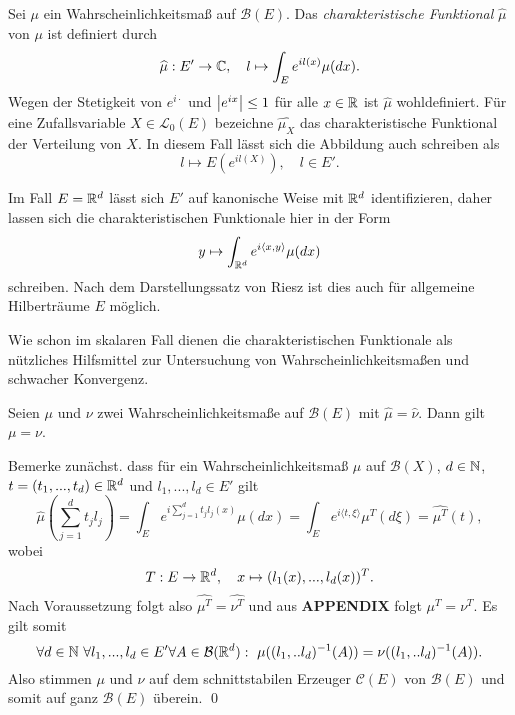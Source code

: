 \begin{mydef}
    Sei $\mu$ ein Wahrscheinlichkeitsmaß auf $\mathcal{B}(E)$. 
    Das \textit{charakteristische Funktional} $\widehat{\mu}$ von $\mu$ ist definiert durch
    $$
        \widehat{\mu} : E' \to \mathbb{C}, \quad l \mapsto \int_{E}e^{il(x)}\mu(dx).
    $$
    Wegen der Stetigkeit von $e^{i\cdot}$ und $\left| e^{ix} \right|\leq 1$ für alle $x \in \mathbb{R}$ ist $\widehat{\mu}$ wohldefiniert. 
    Für eine Zufallsvariable $X \in \mathcal{L}_0(E)$ bezeichne $\widehat{\mu_X}$ das charakteristische Funktional der Verteilung von $X$. In diesem Fall lässt sich die Abbildung auch schreiben als
    $$
        l \mapsto E(e^{il(X)}), \quad l \in E'. 
    $$
\end{mydef}



\begin{remark}
    Im Fall $E = \mathbb{R}^d$ lässt sich $E'$ auf kanonische Weise mit $\mathbb{R}^d$ identifizieren, daher lassen sich die charakteristischen Funktionale hier in der Form 
    $$
        y \mapsto \int_{\mathbb{R}^d}e^{i\langle x, y\rangle}\mu(dx)
    $$
    schreiben. Nach dem Darstellungssatz von Riesz ist dies auch für allgemeine Hilberträume $E$ möglich. 
\end{remark}

Wie schon im skalaren Fall dienen die charakteristischen Funktionale als nützliches Hilfsmittel zur Untersuchung von Wahrscheinlichkeitsmaßen und schwacher Konvergenz.

\begin{theorem}[Eindeutigkeitssatz]
    Seien $\mu$ und $\nu$ zwei Wahrscheinlichkeitsmaße auf $\mathcal{B}(E)$ mit $\widehat{\mu} = \widehat{\nu}$. Dann gilt $\mu = \nu$.
\end{theorem}

\begin{proof*}
    Bemerke zunächst. dass für ein Wahrscheinlichkeitsmaß $\mu$ auf $\mathcal{B}(X)$, $d \in  \mathbb{N}$, $t=(t_1,...,t_d) \in \mathbb{R}^d$ und $l_1,..., l_d \in E'$ gilt
    $$
        \widehat{\mu}(\sum_{j=1}^d t_j l_j) = \int_E e^{i\sum_{j=1}^dt_jl_j(x)}\mu(dx) = \int_E e^{i\langle t, \xi \rangle}\mu^T(d\xi) = \widehat{\mu^T}(t),
    $$
    wobei 
    $$
        T: E \to \mathbb{R}^d, \quad x \mapsto (l_1(x),...,l_d(x))^T. 
    $$
    Nach Voraussetzung folgt also $\widehat{\mu^T} = \widehat{\nu^T}$ und aus \textbf{APPENDIX} folgt $\mu^T = \nu^T$. 
    Es gilt somit
    $$
        \forall d\in \N \ \forall l_1,...,l_d \in E' \forall A \in \mathcal{B}(\R^d): \ \mu((l_1,..l_d)^{-1}(A)) =  \nu((l_1,..l_d)^{-1}(A)). 
    $$
    Also stimmen $\mu$ und $\nu$ auf dem schnittstabilen Erzeuger $\mathcal{C}(E)$ von $\mathcal{B}(E)$ und somit auf ganz $\mathcal{B}(E)$ überein. \qed
\end{proof*}

